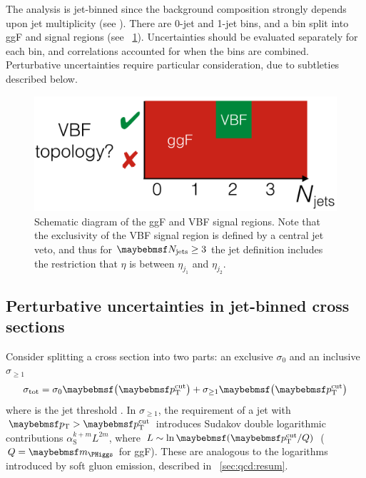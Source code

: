
The analysis is jet-binned since the background composition strongly depends upon jet 
multiplicity (see \Figure{}). There are 0-jet and 1-jet bins, and a 
\twojet bin split into \ac{ggF} and  signal regions (see 
\Figure~\ref{fig:sig:jetbinning}). Uncertainties should be evaluated separately for each 
bin, and correlations accounted for when the bins are combined. Perturbative 
uncertainties require particular consideration, due to subtleties described below.

\begin{figure}
	\includegraphics[width=\mediumfigwidth]{tex/signal/signal_jetbins}
	\caption{Schematic diagram of the \ac{ggF} and \ac{VBF} signal regions. Note that the 
	exclusivity of the \ac{VBF} signal region is defined by a central jet veto, and thus 
	for $\njets \geq 3$ the jet definition includes the restriction that $\eta$ is 
	between $\eta_{j_1}$ and $\eta_{j_2}$.}
	\label{fig:sig:jetbinning}
\end{figure}



\subsection{Perturbative uncertainties in jet-binned cross sections}
\label{sec:ggF:naive}

Consider splitting a cross section into two parts: an exclusive $\sigma_0$ and an 
inclusive $\sigma_{\geq1}$
\begin{equation}
	\sigma_{\total} = \sigma_0 \parenths{\ptcut} + \sigma_{\geq1} \parenths{\ptcut}
\end{equation}
where \ptcut is the jet \pt threshold \cite{YR2}. In $\sigma_{\geq1}$, the requirement of 
a jet with $\pt > \ptcut$ introduces Sudakov double logarithmic contributions 
$\alpha_{\text{S}}^{k+m} L^{2m}$, where $L \sim \ln\parenths{\ptcut/Q}$ ($Q = \mH$ for 
\ac{ggF}). These are analogous to the logarithms introduced by soft gluon emission, 
described in \Section~\ref{sec:qcd:resum}. 


